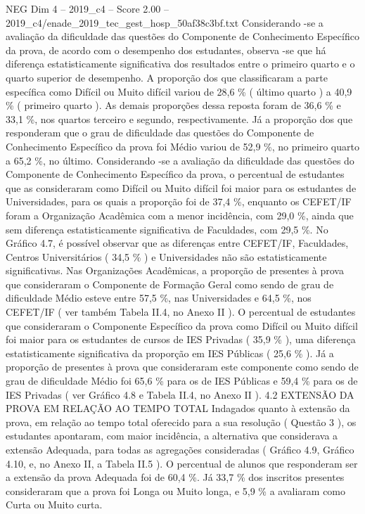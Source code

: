 \begin{textsample}{NEG Dim 4 – 2019\_c4 – Score 2.00 – 2019\_c4/enade\_2019\_tec\_gest\_hosp\_50af38c3bf.txt}
Considerando -se a avaliação da dificuldade das questões do Componente de Conhecimento Específico da prova, de acordo com o desempenho dos estudantes, observa -se que há diferença estatisticamente significativa dos resultados entre o primeiro quarto e o quarto superior de desempenho.
A proporção dos que classificaram a parte específica como Difícil ou Muito difícil variou de 28,6 \% ( último quarto ) a 40,9 \% ( primeiro quarto ).
As demais proporções dessa reposta foram de 36,6 \% e 33,1 \%, nos quartos terceiro e segundo, respectivamente.
Já a proporção dos que responderam que o grau de dificuldade das questões do Componente de Conhecimento Específico da prova foi Médio variou de 52,9 \%, no primeiro quarto a 65,2 \%, no último.
Considerando -se a avaliação da dificuldade das questões do Componente de Conhecimento Específico da prova, o percentual de estudantes que as consideraram como Difícil ou Muito difícil foi maior para os estudantes de Universidades, para os quais a proporção foi de 37,4 \%, enquanto os CEFET/IF foram a Organização Acadêmica com a menor incidência, com 29,0 \%, ainda que sem diferença estatisticamente significativa de Faculdades, com 29,5 \%.
No Gráfico 4.7, é possível observar que as diferenças entre CEFET/IF, Faculdades, Centros Universitários ( 34,5 \% ) e Universidades não são estatisticamente significativas.
Nas Organizações Acadêmicas, a proporção de presentes à prova que consideraram o Componente de Formação Geral como sendo de grau de dificuldade Médio esteve entre 57,5 \%, nas Universidades e 64,5 \%, nos CEFET/IF ( ver também Tabela II.4, no Anexo II ).
O percentual de estudantes que consideraram o Componente Específico da prova como Difícil ou Muito difícil foi maior para os estudantes de cursos de IES Privadas ( 35,9 \% ), uma diferença estatisticamente significativa da proporção em IES Públicas ( 25,6 \% ).
Já a proporção de presentes à prova que consideraram este componente como sendo de grau de dificuldade Médio foi 65,6 \% para os de IES Públicas e 59,4 \% para os de IES Privadas ( ver Gráfico 4.8 e Tabela II.4, no Anexo II ). 4.2 EXTENSÃO DA PROVA EM RELAÇÃO AO TEMPO TOTAL Indagados quanto à extensão da prova, em relação ao tempo total oferecido para a sua resolução ( Questão 3 ), os estudantes apontaram, com maior incidência, a alternativa que considerava a extensão Adequada, para todas as agregações consideradas ( Gráfico 4.9, Gráfico 4.10, e, no Anexo II, a Tabela II.5 ).
O percentual de alunos que responderam ser a extensão da prova Adequada foi de 60,4 \%.
Já 33,7 \% dos inscritos presentes consideraram que a prova foi Longa ou Muito longa, e 5,9 \% a avaliaram como Curta ou Muito curta.

\end{textsample}

